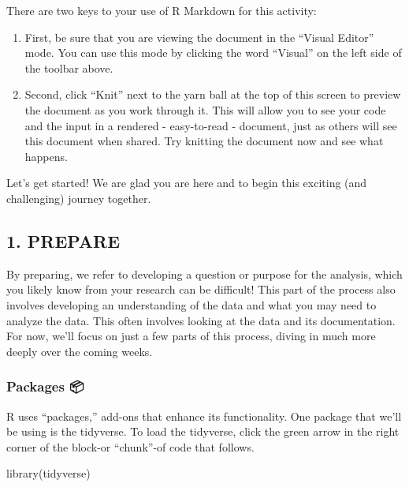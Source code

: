 \documentclass[
]{article}
\newenvironment{Shaded}{\begin{snugshade}}{\end{snugshade}}
\newcommand{\FunctionTok}[1]{\textcolor[rgb]{0.00,0.00,0.00}{#1}}
\newcommand{\NormalTok}[1]{#1}
\providecommand{\tightlist}{%
  \setlength{\itemsep}{0pt}\setlength{\parskip}{0pt}}
\begin{document}
There are two keys to your use of R Markdown for this activity:

\begin{enumerate}
\def\labelenumi{\arabic{enumi}.}
\tightlist
\item
  First, be sure that you are viewing the document in the ``Visual
  Editor'' mode. You can use this mode by clicking the word ``Visual''
  on the left side of the toolbar above.
\item
  Second, click ``Knit'' next to the yarn ball at the top of this screen
  to preview the document as you work through it. This will allow you to
  see your code and the input in a rendered - easy-to-read - document,
  just as others will see this document when shared. Try knitting the
  document now and see what happens.
\end{enumerate}

Let's get started! We are glad you are here and to begin this exciting
(and challenging) journey together.

\hypertarget{prepare}{%
\subsection{1. PREPARE}\label{prepare}}

By preparing, we refer to developing a question or purpose for the
analysis, which you likely know from your research can be difficult!
This part of the process also involves developing an understanding of
the data and what you may need to analyze the data. This often involves
looking at the data and its documentation. For now, we'll focus on just
a few parts of this process, diving in much more deeply over the coming
weeks.

\hypertarget{packages}{%
\subsubsection{Packages 📦}\label{packages}}

R uses ``packages,'' add-ons that enhance its functionality. One package
that we'll be using is the tidyverse. To load the tidyverse, click the
green arrow in the right corner of the block-or ``chunk''-of code that
follows.

\begin{Shaded}
\begin{Highlighting}[]
\FunctionTok{library}\NormalTok{(tidyverse)}
\end{Highlighting}
\end{Shaded}
\end{document}
